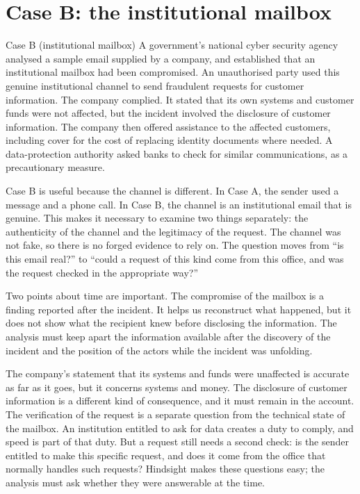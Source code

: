 \section{Case B: the institutional mailbox}

\begin{casehistory}{Case B (institutional mailbox)}
	A government's national cyber security agency analysed a sample email supplied by a company, and established that an institutional mailbox had been compromised. An unauthorised party used this genuine institutional channel to send fraudulent requests for customer information. The company complied. It stated that its own systems and customer funds were not affected, but the incident involved the disclosure of customer information. The company then offered assistance to the affected customers, including cover for the cost of replacing identity documents where needed. A data-protection authority asked banks to check for similar communications, as a precautionary measure.\end{casehistory}

Case B is useful because the channel is different. In Case A, the sender used a message and a phone call. In Case B, the channel is an institutional email that is genuine. This makes it necessary to examine two things separately: the authenticity of the channel and the legitimacy of the request. The channel was not fake, so there is no forged evidence to rely on. The question moves from ``is this email real?'' to ``could a request of this kind come from this office, and was the request checked in the appropriate way?''

Two points about time are important. The compromise of the mailbox is a finding reported after the incident. It helps us reconstruct what happened, but it does not show what the recipient knew before disclosing the information. The analysis must keep apart the information available after the discovery of the incident and the position of the actors while the incident was unfolding.

The company's statement that its systems and funds were unaffected is accurate as far as it goes, but it concerns systems and money. The disclosure of customer information is a different kind of consequence, and it must remain in the account. The verification of the request is a separate question from the technical state of the mailbox. An institution entitled to ask for data creates a duty to comply, and speed is part of that duty. But a request still needs a second check: is the sender entitled to make this specific request, and does it come from the office that normally handles such requests? Hindsight makes these questions easy; the analysis must ask whether they were answerable at the time.

